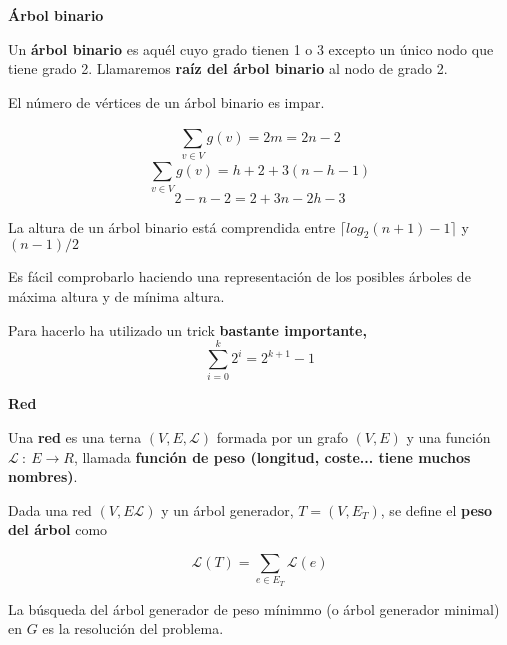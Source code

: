 \documentclass[openany]{book}
\begin{document}
\begin{definition}
  { \color{turquoise} \textbf{Árbol binario}}

  Un \textbf{árbol binario} es aquél cuyo grado tienen 1 o 3 excepto un único nodo que tiene grado 2. Llamaremos \textbf{raíz del árbol binario} al nodo de grado 2.
\end{definition}


\begin{proposition}
  El número de vértices de un árbol binario es impar.
\end{proposition}
\begin{demonstration}
  $$ \sum_{v \in V}^{} g(v) = 2m = 2n-2 $$
  $$ \sum_{v \in V}^{} g(v) = h+2+3(n-h-1) $$
  $$ 2-n-2 = 2+3n-2h-3 $$
\end{demonstration}



\begin{proposition}
  La altura de un árbol binario está comprendida entre $ \lceil log_2(n+1)-1 \rceil $ y $ (n-1)/2 $
\end{proposition}

\begin{demonstration}
  Es fácil comprobarlo haciendo una representación de los posibles árboles de máxima altura y de mínima altura.

  Para hacerlo ha utilizado un trick \textbf{bastante importante,}
  $$ \sum_{i=0}^{k}2^i=2^{k+1}-1 $$
\end{demonstration}


\begin{definition}
  { \color{turquoise} \textbf{Red}}

  Una \textbf{red} es una terna $(V,E, \mathcal{L})$ formada por un grafo $(V,E)$ y una función $\mathcal{L} \ : \ E \to R$, llamada \textbf{función de peso (longitud, coste... tiene muchos nombres)}.
\end{definition}


\begin{definition}
  Dada una red $(V, E \mathcal{L})$ y un árbol generador, $T=(V, E_T)$, se define el \textbf{peso del árbol} como

  $$ \mathcal{L}(T) = \sum_{e \in E_T}\mathcal{L}(e) $$
\end{definition}

La búsqueda del árbol generador de peso mínimmo (o árbol generador minimal) en $ G $ es la resolución del problema.
\end{document}
